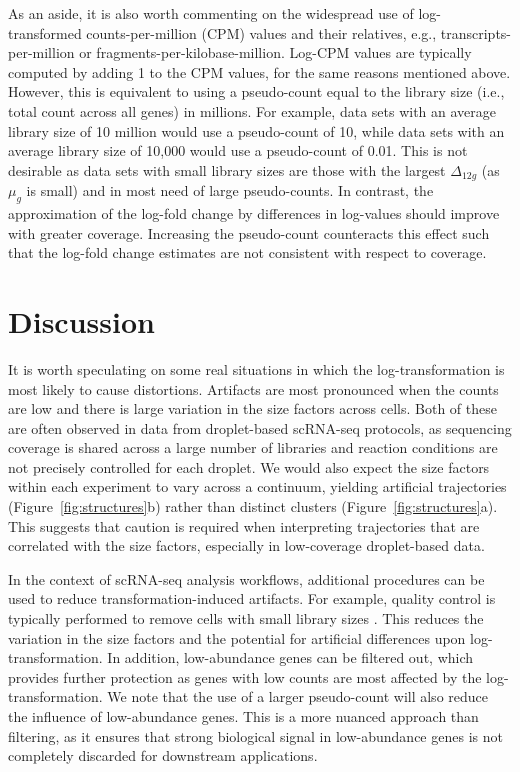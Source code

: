 \documentclass[10pt,letterpaper]{article}
\begin{document}
As an aside, it is also worth commenting on the widespread use of log-transformed counts-per-million (CPM) values and their relatives, e.g., transcripts-per-million or fragments-per-kilobase-million.
Log-CPM values are typically computed by adding 1 to the CPM values, for the same reasons mentioned above.
However, this is equivalent to using a pseudo-count equal to the library size (i.e., total count across all genes) in millions.
For example, data sets with an average library size of 10 million would use a pseudo-count of 10, while data sets with an average library size of 10,000 would use a pseudo-count of 0.01.
This is not desirable as data sets with small library sizes are those with the largest $\Delta_{12g}$ (as $\mu_g$ is small) and in most need of large pseudo-counts.
In contrast, the approximation of the log-fold change by differences in log-values should improve with greater coverage.
Increasing the pseudo-count counteracts this effect such that the log-fold change estimates are not consistent with respect to coverage.

\section{Discussion}
It is worth speculating on some real situations in which the log-transformation is most likely to cause distortions.
Artifacts are most pronounced when the counts are low and there is large variation in the size factors across cells.
Both of these are often observed in data from droplet-based scRNA-seq protocols, as sequencing coverage is shared across a large number of libraries and reaction conditions are not precisely controlled for each droplet.
We would also expect the size factors within each experiment to vary across a continuum, yielding artificial trajectories (Figure~\ref{fig:structures}b) rather than distinct clusters (Figure~\ref{fig:structures}a).
This suggests that caution is required when interpreting trajectories that are correlated with the size factors, especially in low-coverage droplet-based data.

In the context of scRNA-seq analysis workflows, additional procedures can be used to reduce transformation-induced artifacts.
For example, quality control is typically performed to remove cells with small library sizes \cite{ilicic2016classification,lun2016stepbystep}.
This reduces the variation in the size factors and the potential for artificial differences upon log-transformation.
In addition, low-abundance genes can be filtered out, which provides further protection as genes with low counts are most affected by the log-transformation.
We note that the use of a larger pseudo-count will also reduce the influence of low-abundance genes.
This is a more nuanced approach than filtering, as it ensures that strong biological signal in low-abundance genes is not completely discarded for downstream applications.
\end{document}
